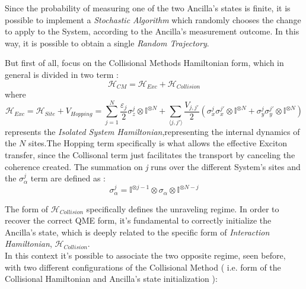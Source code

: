 \documentclass[a4paper,12pt]{article}
\begin{document}
	Since the probability of measuring one of the two Ancilla's states is finite, it is possible to implement a \textit{Stochastic Algorithm} which randomly chooses the change to apply to the System, according to the Ancilla's measurement outcome. In this way, it is possible to obtain a single \textit{Random Trajectory}.

	But first of all, focus on the Collisional Methods Hamiltonian form, which in general is divided in two term :
	\begin{equation}
		\mathcal{H}_{CM} = \mathcal{H}_{Exc} + \mathcal{H}_{Collision}
		\label{eq:CM_hamiltonian}
	\end{equation}
	where
	\begin{equation}
		\mathcal{H}_{Exc} = \mathcal{H}_{Site} + V_{Hopping} = \sum_{j=1}^{N} {\frac{\varepsilon_j}{2} \sigma_{z}^{j} \otimes \mathbb{I}^{\otimes N} } + \sum_{\langle j,j' \rangle} {\frac{V_{j,j'}}{2} \left( \sigma_{x}^{j}\sigma_{x}^{j'} \otimes \mathbb{I}^{\otimes N} + \sigma_{y}^{j}\sigma_{y}^{j'} \otimes \mathbb{I}^{\otimes N} \right)}
		\label{eq:Exc_Hamiltonian}
	\end{equation}  represents the \textit{Isolated System Hamiltonian},representing the internal dynamics of the $N$ sites.The Hopping term specifically is what allows the effective Exciton transfer, since the Collisonal term just facilitates the transport by canceling the coherence created. The summation on \textit{j} runs over the different System's sites and the  $ \sigma_{\alpha}^j $ term are defined as :
	\begin{equation}
		\sigma_{\alpha}^j  = \mathbb{I}^{\otimes j-1} \otimes \sigma_{\alpha} \otimes \mathbb{I}^{\otimes N-j}
		\label{eq:sigma_op_definition}
	\end{equation}

	The form of $ \mathcal{H}_{Collision} $ specifically defines the unraveling regime. In order to recover the correct QME form, it's fundamental to correctly initialize the Ancilla's state, which is deeply related to the specific form of \textit{Interaction Hamiltonian}, $ \mathcal{H}_{Collision} $. \\
	In this context it's possible to associate the two opposite regime, seen before, with two different configurations of the Collisional Method ( i.e. form of the Collisional Hamiltonian and Ancilla's state initialization ):
\end{document}

